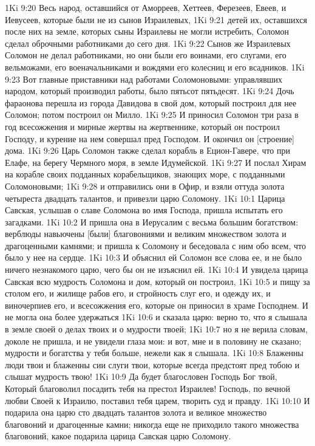 1Ki 9:20  Весь народ, оставшийся от Аморреев, Хеттеев, Ферезеев, Евеев, и Иевусеев, которые были не из сынов Израилевых,
1Ki 9:21  детей их, оставшихся после них на земле, которых сыны Израилевы не могли истребить, Соломон сделал оброчными работниками до сего дня.
1Ki 9:22  Сынов же Израилевых Соломон не делал работниками, но они были его воинами, его слугами, его вельможами, его военачальниками и вождями его колесниц и его всадников.
1Ki 9:23  Вот главные приставники над работами Соломоновыми: управлявших народом, который производил работы, было пятьсот пятьдесят.
1Ki 9:24  Дочь фараонова перешла из города Давидова в свой дом, который построил для нее Соломон; потом построил он Милло.
1Ki 9:25  И приносил Соломон три раза в год всесожжения и мирные жертвы на жертвеннике, который он построил Господу, и курение на нем совершал пред Господом. И окончил он [строение] дома.
1Ki 9:26  Царь Соломон также сделал корабль в Ецион-Гавере, что при Елафе, на берегу Чермного моря, в земле Идумейской.
1Ki 9:27  И послал Хирам на корабле своих подданных корабельщиков, знающих море, с подданными Соломоновыми;
1Ki 9:28  и отправились они в Офир, и взяли оттуда золота четыреста двадцать талантов, и привезли царю Соломону.
1Ki 10:1  Царица Савская, услышав о славе Соломона во имя Господа, пришла испытать его загадками.
1Ki 10:2  И пришла она в Иерусалим с весьма большим богатством: верблюды навьючены [были] благовониями и великим множеством золота и драгоценными камнями; и пришла к Соломону и беседовала с ним обо всем, что было у нее на сердце.
1Ki 10:3  И объяснил ей Соломон все слова ее, и не было ничего незнакомого царю, чего бы он не изъяснил ей.
1Ki 10:4  И увидела царица Савская всю мудрость Соломона и дом, который он построил,
1Ki 10:5  и пищу за столом его, и жилище рабов его, и стройность слуг его, и одежду их, и виночерпиев его, и всесожжения его, которые он приносил в храме Господнем. И не могла она более удержаться
1Ki 10:6  и сказала царю: верно то, что я слышала в земле своей о делах твоих и о мудрости твоей;
1Ki 10:7  но я не верила словам, доколе не пришла, и не увидели глаза мои: и вот, мне и в половину не сказано; мудрости и богатства у тебя больше, нежели как я слышала.
1Ki 10:8  Блаженны люди твои и блаженны сии слуги твои, которые всегда предстоят пред тобою и слышат мудрость твою!
1Ki 10:9  Да будет благословен Господь Бог твой, Который благоволил посадить тебя на престол Израилев! Господь, по вечной любви Своей к Израилю, поставил тебя царем, творить суд и правду.
1Ki 10:10  И подарила она царю сто двадцать талантов золота и великое множество благовоний и драгоценные камни; никогда еще не приходило такого множества благовоний, какое подарила царица Савская царю Соломону.
